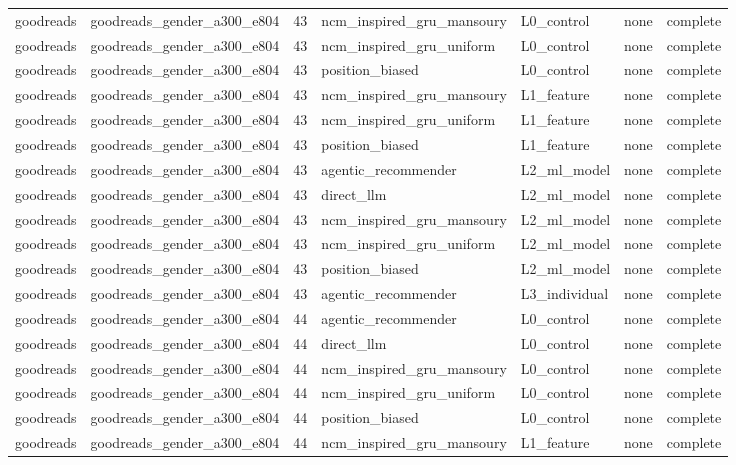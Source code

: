 \begin{table}[htbp!]
\begin{tabular}{llrllll}
goodreads & goodreads\_gender\_a300\_e804 & 43 & ncm\_inspired\_gru\_mansoury & L0\_control & none & complete \\
goodreads & goodreads\_gender\_a300\_e804 & 43 & ncm\_inspired\_gru\_uniform & L0\_control & none & complete \\
goodreads & goodreads\_gender\_a300\_e804 & 43 & position\_biased & L0\_control & none & complete \\
goodreads & goodreads\_gender\_a300\_e804 & 43 & ncm\_inspired\_gru\_mansoury & L1\_feature & none & complete \\
goodreads & goodreads\_gender\_a300\_e804 & 43 & ncm\_inspired\_gru\_uniform & L1\_feature & none & complete \\
goodreads & goodreads\_gender\_a300\_e804 & 43 & position\_biased & L1\_feature & none & complete \\
goodreads & goodreads\_gender\_a300\_e804 & 43 & agentic\_recommender & L2\_ml\_model & none & complete \\
goodreads & goodreads\_gender\_a300\_e804 & 43 & direct\_llm & L2\_ml\_model & none & complete \\
goodreads & goodreads\_gender\_a300\_e804 & 43 & ncm\_inspired\_gru\_mansoury & L2\_ml\_model & none & complete \\
goodreads & goodreads\_gender\_a300\_e804 & 43 & ncm\_inspired\_gru\_uniform & L2\_ml\_model & none & complete \\
goodreads & goodreads\_gender\_a300\_e804 & 43 & position\_biased & L2\_ml\_model & none & complete \\
goodreads & goodreads\_gender\_a300\_e804 & 43 & agentic\_recommender & L3\_individual & none & complete \\
goodreads & goodreads\_gender\_a300\_e804 & 44 & agentic\_recommender & L0\_control & none & complete \\
goodreads & goodreads\_gender\_a300\_e804 & 44 & direct\_llm & L0\_control & none & complete \\
goodreads & goodreads\_gender\_a300\_e804 & 44 & ncm\_inspired\_gru\_mansoury & L0\_control & none & complete \\
goodreads & goodreads\_gender\_a300\_e804 & 44 & ncm\_inspired\_gru\_uniform & L0\_control & none & complete \\
goodreads & goodreads\_gender\_a300\_e804 & 44 & position\_biased & L0\_control & none & complete \\
goodreads & goodreads\_gender\_a300\_e804 & 44 & ncm\_inspired\_gru\_mansoury & L1\_feature & none & complete \\

\end{tabular}
\end{table}
